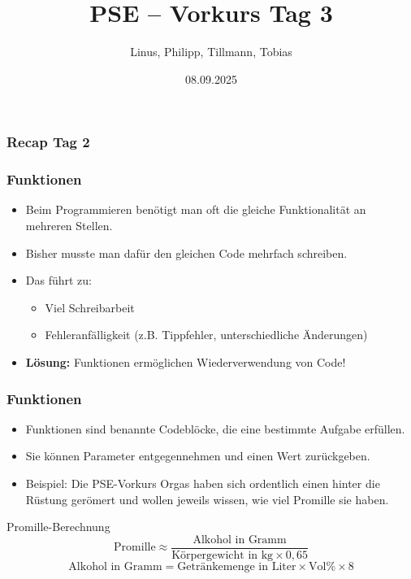 \documentclass{../../presentation}
\title{PSE – Vorkurs Tag 3}
\author{Linus, Philipp, Tillmann, Tobias}
\institute{FIUS - Fachgruppe Informatik Universität Stuttgart}
\date{08.09.2025}
\begin{document}
\begin{frame}
    \titlepage
\end{frame}

\begin{frame}
    \listoftodos
\end{frame}

\begin{frame}
    \frametitle{Recap Tag 2}
\end{frame}

\begin{frame}[fragile]
    \frametitle{Funktionen}
    \begin{itemize}
        \item Beim Programmieren benötigt man oft die gleiche Funktionalität an mehreren Stellen.
        \item Bisher musste man dafür den gleichen Code mehrfach schreiben.
        \item Das führt zu:
              \begin{itemize}
                  \item Viel Schreibarbeit
                  \item Fehleranfälligkeit (z.B. Tippfehler, unterschiedliche Änderungen)
              \end{itemize}
        \item \textbf{Lösung:} Funktionen ermöglichen Wiederverwendung von Code!
    \end{itemize}
\end{frame}

\begin{frame}
    \frametitle{Funktionen}
    \begin{itemize}
        \item Funktionen sind benannte Codeblöcke, die eine bestimmte Aufgabe erfüllen.
        \item Sie können Parameter entgegennehmen und einen Wert zurückgeben.
        \item Beispiel: Die PSE-Vorkurs Orgas haben sich ordentlich einen hinter die Rüstung gerömert und wollen jeweils wissen, wie viel Promille sie haben.
    \end{itemize}
    \begin{block}{Promille-Berechnung}
        \[
            \text{Promille} \approx \frac{\text{Alkohol in Gramm}}{\text{Körpergewicht in kg} \times 0{,}65}
        \]
        \[
            \text{Alkohol in Gramm} = \text{Getränkemenge in Liter} \times \text{Vol\%} \times 8
        \]
    \end{block}
\end{frame}
\end{document}

